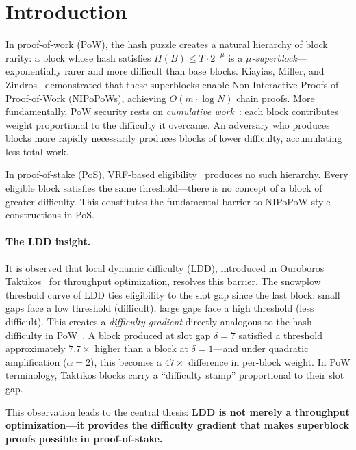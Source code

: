 \documentclass[11pt]{article}
\begin{document}
\section{Introduction}

In proof-of-work (PoW), the hash puzzle creates a natural hierarchy of block rarity: a block whose hash satisfies $H(B) \leq T \cdot 2^{-\mu}$ is a \emph{$\mu$-superblock}---exponentially rarer and more difficult than base blocks. Kiayias, Miller, and Zindros~\cite{nipopows} demonstrated that these superblocks enable Non-Interactive Proofs of Proof-of-Work (NIPoPoWs), achieving $O(m \cdot \log N)$ chain proofs. More fundamentally, PoW security rests on \emph{cumulative work}~\cite{backbone}: each block contributes weight proportional to the difficulty it overcame. An adversary who produces blocks more rapidly necessarily produces blocks of lower difficulty, accumulating less total work.

In proof-of-stake (PoS), VRF-based eligibility~\cite{vrf} produces no such hierarchy. Every eligible block satisfies the same threshold---there is no concept of a block of greater difficulty. This constitutes the fundamental barrier to NIPoPoW-style constructions in PoS.

\paragraph{The LDD insight.} It is observed that local dynamic difficulty (LDD), introduced in Ouroboros Taktikos~\cite{taktikos} for throughput optimization, resolves this barrier. The snowplow threshold curve of LDD ties eligibility to the slot gap since the last block: small gaps face a low threshold (difficult), large gaps face a high threshold (less difficult). This creates a \emph{difficulty gradient} directly analogous to the hash difficulty in PoW~\cite{nakamoto}. A block produced at slot gap $\delta = 7$ satisfied a threshold approximately $7.7\times$ higher than a block at $\delta = 1$---and under quadratic amplification ($\alpha = 2$), this becomes a $47\times$ difference in per-block weight. In PoW terminology, Taktikos blocks carry a ``difficulty stamp'' proportional to their slot gap.

This observation leads to the central thesis: \textbf{LDD is not merely a throughput optimization---it provides the difficulty gradient that makes superblock proofs possible in proof-of-stake.}
\end{document}
